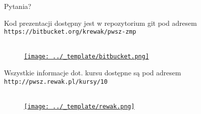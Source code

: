 \appendix

\begin{frame}[standout]
	Pytania?
\end{frame}

\begin{frame}{}

	Kod prezentacji dostępny jest w repozytorium git pod adresem \texttt{https://bitbucket.org/krewak/pwsz-zmp} \\ \ \\

	\begin{figure}
		\centering
		\href{https://bitbucket.org/krewak/pwsz-ppsi}{
			\texttt{[image: ../\_template/bitbucket.png]}
		}
	\end{figure}
	
	Wszystkie informacje dot. kursu dostępne są pod adresem \texttt{http://pwsz.rewak.pl/kursy/10} \\ \ \\

	\begin{figure}
		\centering
		\href{http://pwsz.rewak.pl/kursy/3}{
			\texttt{[image: ../\_template/rewak.png]}
		}
	\end{figure}

\end{frame}


